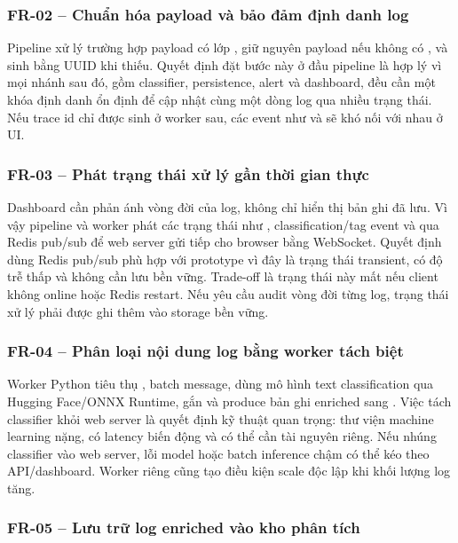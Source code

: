 \subsubsection{FR-02 -- Chuẩn hóa payload và bảo đảm định danh log}

Pipeline  xử lý trường hợp payload có lớp , giữ nguyên payload nếu không có , và sinh  bằng UUID khi thiếu. Quyết định đặt bước này ở đầu pipeline là hợp lý vì mọi nhánh sau đó, gồm classifier, persistence, alert và dashboard, đều cần một khóa định danh ổn định để cập nhật cùng một dòng log qua nhiều trạng thái. Nếu trace id chỉ được sinh ở worker sau, các event như  và  sẽ khó nối với nhau ở UI.

\subsubsection{FR-03 -- Phát trạng thái xử lý gần thời gian thực}

Dashboard cần phản ánh vòng đời của log, không chỉ hiển thị bản ghi đã lưu. Vì vậy pipeline và worker phát các trạng thái như , classification/tag event và  qua Redis pub/sub để web server gửi tiếp cho browser bằng WebSocket. Quyết định dùng Redis pub/sub phù hợp với prototype vì đây là trạng thái transient, có độ trễ thấp và không cần lưu bền vững. Trade-off là trạng thái này mất nếu client không online hoặc Redis restart. Nếu yêu cầu audit vòng đời từng log, trạng thái xử lý phải được ghi thêm vào storage bền vững.

\subsubsection{FR-04 -- Phân loại nội dung log bằng worker tách biệt}

Worker Python tiêu thụ , batch message, dùng mô hình text classification qua Hugging Face/ONNX Runtime, gắn  và produce bản ghi enriched sang . Việc tách classifier khỏi web server là quyết định kỹ thuật quan trọng: thư viện machine learning nặng, có latency biến động và có thể cần tài nguyên riêng. Nếu nhúng classifier vào web server, lỗi model hoặc batch inference chậm có thể kéo theo API/dashboard. Worker riêng cũng tạo điều kiện scale độc lập khi khối lượng log tăng.

\subsubsection{FR-05 -- Lưu trữ log enriched vào kho phân tích}

